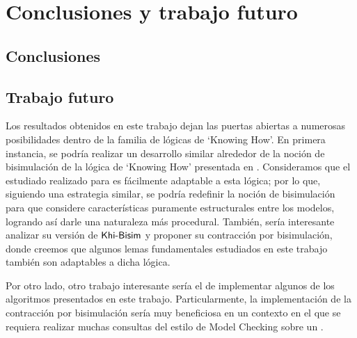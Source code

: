\chapter{Conclusiones y trabajo futuro}

\section{Conclusiones}


\section{Trabajo futuro}

Los resultados obtenidos en este trabajo dejan las puertas abiertas a numerosas posibilidades dentro de la familia de lógicas de `Knowing How'. 
En primera instancia, se podría realizar un desarrollo similar alrededor de la noción de bisimulación de la lógica de `Knowing How' presentada 
en \cite{Wang15KH,Wang2018GoalDirectedKH}. Consideramos que el estudiado realizado para \KHilogic es fácilmente adaptable a esta lógica; por lo que, siguiendo 
una estrategia similar, se podría redefinir la noción de bisimulación para que considere características puramente estructurales entre los modelos, 
logrando así darle una naturaleza más procedural. También, sería interesante analizar su versión de $\rm\textsf{Khi-Bisim}$ y proponer su contracción 
por bisimulación, donde creemos que algunos lemas fundamentales estudiados en este trabajo también son adaptables a dicha lógica.

Por otro lado, otro trabajo interesante sería el de implementar algunos de los algoritmos presentados en este trabajo. Particularmente, 
la implementación de la contracción por bisimulación sería muy beneficiosa en un contexto en el que se requiera realizar muchas consultas del 
estilo de Model Checking sobre un \ults.

